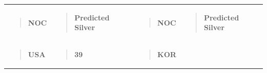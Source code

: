 \documentclass[12pt,a4paper]{article}
\renewenvironment{quote}{\begin{quotation}}{\end{quotation}}  %
\begin{document}
    \begin{longtable}[]{@{}
      >{\raggedright\arraybackslash}p{}
      >{\raggedright\arraybackslash}p{}
      >{\raggedright\arraybackslash}p{}
      >{\raggedright\arraybackslash}p{}@{}}
    \toprule\noalign{}
    \endhead
    \bottomrule\noalign{}
    \endlastfoot
    \begin{minipage}[t]{\linewidth}\raggedright
    \begin{quote}
    \textbf{NOC}
    \end{quote}
    \end{minipage} & \begin{minipage}[t]{\linewidth}\raggedright
    \begin{quote}
    \textbf{Predicted Silver}
    \end{quote}
    \end{minipage} & \begin{minipage}[t]{\linewidth}\raggedright
    \begin{quote}
    \textbf{NOC}
    \end{quote}
    \end{minipage} & \begin{minipage}[t]{\linewidth}\raggedright
    \begin{quote}
    \textbf{Predicted Silver}
    \end{quote}
    \end{minipage} \\
    \begin{minipage}[t]{\linewidth}\raggedright
    \begin{quote}
    \textbf{USA}
    \end{quote}
    \end{minipage} & \begin{minipage}[t]{\linewidth}\raggedright
    \begin{quote}
    \textbf{39}
    \end{quote}
    \end{minipage} & \begin{minipage}[t]{\linewidth}\raggedright
    \begin{quote}
    \textbf{KOR}
    \end{quote}
    \end{minipage} & \begin{minipage}[t]{\linewidth}\raggedright
    \begin{quote}

\end{quote}
\end{minipage}
\end{longtable}
\end{document}
